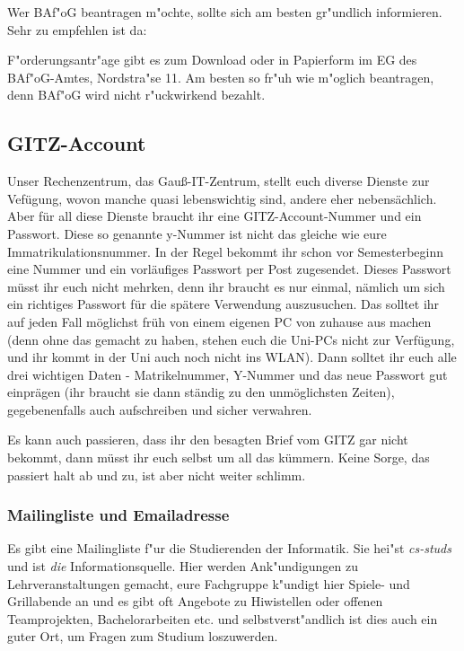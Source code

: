 Wer BAf"oG beantragen m"ochte, sollte sich am besten gr"undlich
informieren. Sehr zu empfehlen ist da: \\
\mbox{}
 
F"orderungsantr"age gibt es zum Download oder in Papierform im
EG des BAf"oG-Amtes, Nordstra"se 11. Am besten so fr"uh
wie m"oglich beantragen, denn BAf"oG wird nicht r"uckwirkend
bezahlt.

\newpage

\vspace*{9.5cm}

\subsection{GITZ-Account}
Unser Rechenzentrum, das Gauß-IT-Zentrum, stellt euch diverse 
Dienste zur Vefügung, wovon manche quasi lebenswichtig sind, 
andere eher nebensächlich. Aber für all diese Dienste braucht 
ihr eine GITZ-Account-Nummer und ein Passwort. Diese so genannte 
y-Nummer ist nicht das gleiche wie eure Immatrikulationsnummer. 
In der Regel bekommt ihr schon vor Semesterbeginn eine Nummer 
und ein vorläufiges Passwort per Post zugesendet. Dieses 
Passwort müsst ihr euch nicht mehrken, denn ihr braucht es nur 
einmal, nämlich um sich ein richtiges Passwort für die spätere 
Verwendung auszusuchen. Das solltet ihr auf jeden Fall möglichst 
früh von einem eigenen PC von zuhause aus machen (denn ohne das 
gemacht zu haben, stehen euch die Uni-PCs nicht zur Verfügung, 
und ihr kommt in der Uni auch noch nicht ins WLAN). Dann solltet 
ihr euch alle drei wichtigen Daten - Matrikelnummer, Y-Nummer 
und das neue Passwort gut einprägen (ihr braucht sie dann 
ständig zu den unmöglichsten Zeiten), gegebenenfalls auch 
aufschreiben und sicher verwahren.

Es kann auch passieren, dass ihr den besagten Brief vom GITZ 
gar nicht bekommt, dann müsst ihr euch selbst um all das kümmern. 
Keine Sorge, das passiert halt ab und zu, ist aber nicht weiter 
schlimm.

\subsubsection{Mailingliste und Emailadresse}

Es gibt eine Mailingliste f"ur die Studierenden der Informatik.
Sie hei"st \emph{cs-studs} und ist \emph{die} Informationsquelle.
Hier werden Ank"undigungen zu Lehrveranstaltungen gemacht, eure
Fachgruppe k"undigt hier Spiele- und Grillabende an und es gibt
oft Angebote zu Hiwistellen oder offenen Teamprojekten,
Bachelorarbeiten etc. und selbstverst"andlich ist dies auch ein
guter Ort, um Fragen zum Studium loszuwerden.

